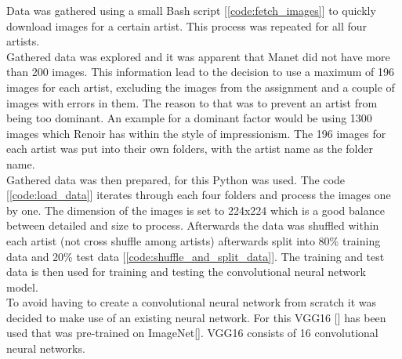  Data was gathered using a small Bash script [\ref{code:fetch_images}] to quickly download images for a certain artist. This process was repeated for all four artists.\\

 Gathered data was explored and it was apparent that Manet did not have more than 200 images. This information lead to the decision to use a maximum of 196 images for each artist, excluding the images from the assignment and a couple of images with errors in them. The reason to that was to prevent an artist from being too dominant. An example for a dominant factor would be using 1300 images which Renoir has within the style of impressionism. The 196 images for each artist was put into their own folders, with the artist name as the folder name.\\

 Gathered data was then prepared, for this Python was used. The code [\ref{code:load_data}] iterates through each four folders and process the images one by one. The dimension of the images is set to 224x224 which is a good balance between detailed and size to process. Afterwards the data was shuffled within each artist (not cross shuffle among artists) afterwards split into 80\% training data and 20\% test data [\ref{code:shuffle_and_split_data}]. The training and test data is then used for training and testing the convolutional neural network model.\\

 To avoid having to create a convolutional neural network from scratch it was decided to make use of an existing neural network. For this VGG16 [\cite{DBLP:journals/corr/SimonyanZ14a}] has been used that was pre-trained on ImageNet[\cite{imagenet_cvpr09}]. VGG16 consists of 16 convolutional neural networks.\\

